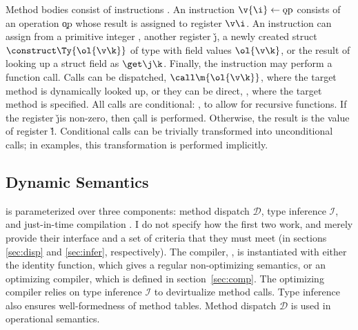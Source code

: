 Method bodies consist of instructions \ol{\st}. An instruction $\v{\i}
\leftarrow \text{\c{op}}$ consists of an operation \c{op} whose result is
assigned to register $\v\i$. An instruction can assign from a primitive integer
\p, another register \v\j, a newly created struct $\construct\Ty{\ol{\v\k}}$
of type \Ty with field values $\ol{\v\k}$, or the result of looking up a struct
field as $\get\j\k$. Finally, the instruction may perform a function call. Calls
can be dispatched, $\call\m{\ol{\v\k}}$, where the target method is dynamically
looked up, or they can be direct, \direct\m{\ol\Ty}{\ol{\v\k}}, where the target
method is specified. All calls are conditional: , to allow for recursive functions.
If the register \v\j is non-zero, then \c{call} is performed. Otherwise,
the result is the value of register \v\l. Conditional calls can be trivially
transformed into unconditional calls; in examples, this transformation is
performed implicitly.

\subsection{Dynamic Semantics}

\jules is parameterized over three components: method dispatch $\mathcal D$,
type inference $\mathcal I$, and just-in-time compilation \jit. I do not
specify how the first two work, and merely provide their interface and a set of
criteria that they must meet (in sections \ref{sec:disp} and \ref{sec:infer},
respectively). The compiler, \jit, is instantiated with either the identity
function, which gives a regular non-optimizing semantics, or an optimizing
compiler, which is defined in section~\ref{sec:comp}. The optimizing compiler
relies on type inference $\mathcal I$ to devirtualize method calls. Type
inference also ensures well-formedness of method tables. Method dispatch
$\mathcal D$ is used in operational semantics.

